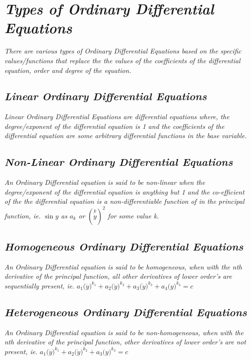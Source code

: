 

\section{\textit{Types of Ordinary Differential Equations}}
	
	\textit{There are various types of Ordinary Differential Equations based on the specific values/functions that replace the the values of the coefficients of the differential equation, order and degree of the equation.}	
	
	\subsection{\textit{Linear Ordinary Differential Equations}}

		\textit{Linear Ordinary Differential Equations are differential equations where, the degree/exponent of the differential equation is 1 and the coefficients of the differential equation are some arbitrary differential functions in the base variable.}

	\subsection{\textit{Non-Linear Ordinary Differential Equations}}

		\textit{An Ordinary Differential equation is said to be non-linear when the degree/exponent of the differential equation is anything but 1 and the co-efficient of the the differential equation is a non-differentiable function of in the principal function, ie. $\sin{y}$ as $a_k$ or $\left(\overset{k}{\dot{y}}\right)^2$ for some value k.}

	\subsection{\textit{Homogeneous Ordinary Differential Equations}}

		\textit{An Ordinary Differential equation is said to be homogeneous, when with the nth derivative of the principal function, all other derivatives of lower order's are sequentially present, ie. $a_{1}\bigg(\dddot{y}\bigg)^{k_1} + a_{2}\bigg(\ddot{y}\bigg)^{k_2} + a_{3}\bigg(\dot{y}\bigg)^{k_3} + a_{4}\bigg(y\bigg)^{k_4} = c$}

	\subsection{\textit{Heterogeneous Ordinary Differential Equations}}

	\textit{An Ordinary Differential equation is said to be non-homogeneous, when with the nth derivative of the principal function, other derivatives of lower order's are not present, ie. $a_{1}\bigg(\dddot{y}\bigg)^{k_1} + a_{2}\bigg(\dot{y}\bigg)^{k_2} + a_{3}\bigg(y\bigg)^{k_3} = c$}


